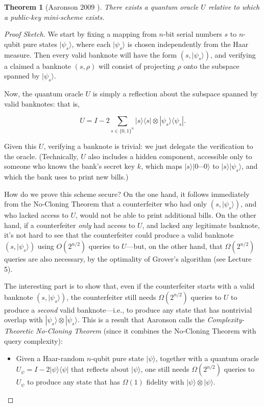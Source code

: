 \documentclass[11pt]{report}
\theoremstyle{plain}
\newtheorem{theorem}{Theorem}[section]
\theoremstyle{definition}
\renewcommand{\bra}[1]{\langle#1|}
\renewcommand{\ket}[1]{|#1\rangle}
\begin{document}
\begin{theorem}[Aaronson 2009 \cite{Aar09}] There exists a quantum oracle $U$ relative to which a public-key mini-scheme exists.
\label{qomoney}
\end{theorem}
\begin{proof}[Proof Sketch] We start by fixing a mapping from $n$-bit serial numbers $s$ to $n$-qubit pure states $\ket{\psi_s}$, where each $\ket{\psi_s}$ is chosen independently from the Haar measure.  Then every valid banknote will have the form $(s,\ket{\psi_s})$, and verifying a claimed a banknote $(s,\rho)$ will consist of projecting $\rho$ onto the subspace spanned by $\ket{\psi_s}$.

Now, the quantum oracle $U$ is simply a reflection about the subspace spanned by valid banknotes: that is,

$$ U = I - 2\sum_{s \in \{0,1\}^n} \ket{s}\bra{s} \otimes \ket{\psi_s}\bra{\psi_s}. $$

Given this $U$, verifying a banknote is trivial: we just delegate the verification to the oracle.  (Technically, $U$ also includes a hidden component, accessible only to someone who knows the bank's secret key $k$, which maps $\ket{s}\ket{0\cdots 0}$ to $\ket{s}\ket{\psi_s}$, and which the bank uses to print new bills.)

How do we prove this scheme secure?  On the one hand, it follows immediately from the No-Cloning Theorem that a counterfeiter who had only $(s,\ket{\psi_s})$, and who lacked access to $U$, would not be able to print additional bills.  On the other hand, if a counterfeiter {\em only} had access to $U$, and lacked any legitimate banknote, it's not hard to see that the counterfeiter could produce a valid banknote $(s,\ket{\psi_s})$ using $O(2^{n/2})$ queries to $U$---but, on the other hand, that $\Omega(2^{n/2})$ queries are also necessary, by the optimality of Grover's algorithm (see Lecture 5).

The interesting part is to show that, even if the counterfeiter starts with a valid banknote $(s,\ket{\psi_s})$, the counterfeiter still needs $\Omega(2^{n/2})$ queries to $U$ to produce a {\em second} valid banknote---i.e., to produce any state that has nontrivial overlap with $\ket{\psi_s}\otimes \ket{\psi_s}$.  This is a result that Aaronson \cite{Aar09} calls the {\em Complexity-Theoretic No-Cloning Theorem} (since it combines the No-Cloning Theorem with query complexity):

\begin{itemize}
\item Given a Haar-random $n$-qubit pure state $\ket{\psi}$, together with a quantum oracle $U_{\psi}=I-2\ket{\psi}\bra{\psi}$ that reflects about $\ket{\psi}$, one still needs $\Omega(2^{n/2})$ queries to $U_{\psi}$ to produce any state that has $\Omega(1)$ fidelity with $\ket{\psi}\otimes \ket{\psi}$.
\end{itemize}


\end{proof}
\end{document}
